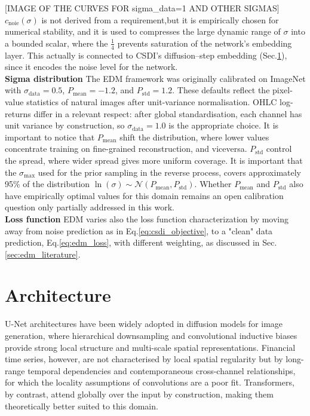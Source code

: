 [IMAGE OF THE CURVES FOR sigma\_data=1 AND OTHER SIGMAS]\\

\(c_{\text{noie}}(\sigma)\) is not derived from a requirement,but it is empirically chosen for numerical stability, and it is used to compresses the large dynamic range of \(\sigma\) into a bounded scalar, where the \(\frac14\) prevents saturation of the network's embedding layer. This actually is connected to CSDI's diffusion--step embedding (Sec.\ref{sec:model_architecture}), since it encodes the noise level for the network.\\


\textbf{Sigma distribution} The EDM framework was originally calibrated on ImageNet \cite{deng2009imagenet} 
with \(\sigma_{\text{data}} = 0.5\), \(P_{\text{mean}} = -1.2\), and 
\(P_{\text{std}} = 1.2\). These defaults reflect the pixel-value statistics 
of natural images after unit-variance normalisation. OHLC log-returns differ 
in a relevant respect: after global standardisation, each channel has unit 
variance by construction, so \(\sigma_{\text{data}} = 1.0\) is the 
appropriate choice. It is important to notice that \(P_{\text{mean}}\) shift the distribution, where lower values concentrate training on fine-grained reconstruction, and viceversa. \(P_{\text{std}}\) control the spread, where wider spread gives more uniform coverage. It is important that the \(\sigma_{\max}\) used for the prior sampling in the reverse process, covers approximately 95\% of the distribution \(\ln (\sigma)\sim \mathcal{N}(P_{\text{mean}}, P_{\text{std}})\). Whether \(P_{\text{mean}}\) and \(P_{\text{std}}\) 
also have empirically optimal values for this domain remains an open calibration question only partially addressed in this work.\\

\textbf{Loss function} EDM varies also the loss function characterization by moving away from noise prediction as in Eq.\ref{eq:csdi_objective}, to a "clean" data prediction, Eq.\ref{eq:edm_loss}, with different weighting, as discussed in Sec.\ref{sec:edm_literature}.

\section{Architecture}
\label{sec:model_architecture}
U-Net architectures \cite{ronneberger2015unet} have been widely adopted 
in diffusion models for image generation, where hierarchical downsampling 
and convolutional inductive biases provide strong local structure and 
multi-scale spatial representations. Financial time series, however, are 
not characterised by local spatial regularity but by long-range temporal 
dependencies and contemporaneous cross-channel relationships, for which 
the locality assumptions of convolutions are a poor fit. Transformers, by 
contrast, attend globally over the input by construction, making them 
theoretically better suited to this domain.\\

